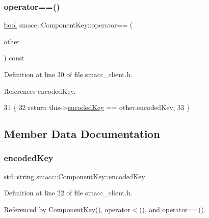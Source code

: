 \subsubsection{\texorpdfstring{operator==()}{operator==()}}
{\footnotesize\ttfamily \hyperlink{classbool}{bool} smacc\+::\+Component\+Key\+::operator== (\begin{DoxyParamCaption}\item[{const \hyperlink{structsmacc_1_1ComponentKey}{Component\+Key} \&}]{other }\end{DoxyParamCaption}) const\hspace{0.3cm}{\ttfamily [inline]}}



Definition at line 30 of file smacc\+\_\+client.\+h.



References encoded\+Key.


\begin{DoxyCode}
31     \{
32         \textcolor{keywordflow}{return} this->\hyperlink{structsmacc_1_1ComponentKey_a4f588034d085ba425808d98c36f8a095}{encodedKey} == other.encodedKey;
33     \}
\end{DoxyCode}


\subsection{Member Data Documentation}
\mbox{\label{structsmacc_1_1ComponentKey_a4f588034d085ba425808d98c36f8a095}} 
\subsubsection{\texorpdfstring{encoded\+Key}{encodedKey}}
{\footnotesize\ttfamily std\+::string smacc\+::\+Component\+Key\+::encoded\+Key}



Definition at line 22 of file smacc\+\_\+client.\+h.



Referenced by Component\+Key(), operator$<$(), and operator==().

\mbox{\label{structsmacc_1_1ComponentKey_ad38f21bde4dad1dd3c143bdc42e6f30d}} 

